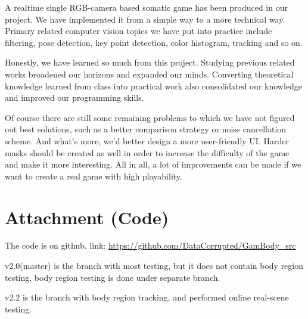 \documentclass[11pt,twocolumn,letterpaper]{article}
\begin{document}
    \par A realtime single RGB-camera based somatic game has been produced in our project. We have implemented it from a simple way to a more technical way. Primary related computer vision topics we have put into practice include filtering, pose detection, key point detection, color histogram, tracking and so on.
    \par Honestly, we have learned so much from this project. Studying previous related works broadened our horizons and expanded our minds. Converting theoretical knowledge learned from class into practical work also consolidated our knowledge and improved our programming skills.

    \par Of course there are still some remaining problems to which we have not figured out best solutions, such as a better comparison strategy or noise cancellation scheme. And what's more, we'd better design a more user-friendly UI. Harder masks should be created as well in order to increase the difficulty of the game and make it more interesting. All in all, a lot of improvements can be made if we want to create a real game with high playability.

\section{Attachment (Code)}
\par
The code is on github. link: \url{https://github.com/DataCorrupted/GamBody_src}
\par
v2.0(master) is the branch with most testing, but it does not contain body region testing, body region testing is done under separate branch.
\par
v2.2 is the branch with body region tracking, and performed online real-scene testing.
{\small


}
\end{document}
